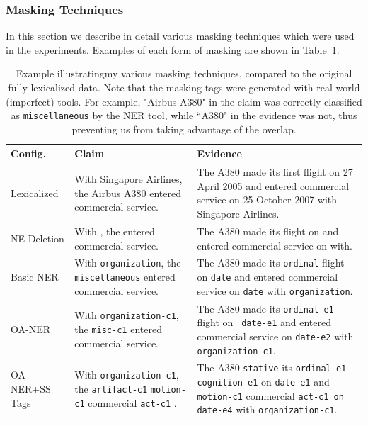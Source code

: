 \documentclass[compsoc,onecolumn]{IEEEtran}
\begin{document}
\subsubsection{Masking Techniques} \label{masking_techniques}
In this section we describe in detail various masking techniques which were used in the experiments. Examples of each form of masking are shown in Table~\ref{masking_examples}.


\begin{table}[t]
\begin{center}
\begin{tabular}{p{20mm}|p{55mm}|p{70mm}}

\textbf{Config.} & \textbf{Claim}& \textbf{Evidence} \\ \hline
Lexicalized & {With Singapore Airlines, the Airbus A380 entered commercial service.} & {The A380 made its first flight on 27 April 2005 and entered commercial service on 25 October 2007 with Singapore Airlines.}\\
\hline 
NE Deletion & {With  , the  entered commercial service.} & {The A380 made its  flight on  and entered commercial service on  with.}\\
\hline 
Basic NER  & {With \texttt{organization}, the \texttt{miscellaneous} entered commercial service.} & {The A380 made its \texttt{ordinal} flight on \texttt{date} and entered commercial service on \texttt{date} with \texttt{organization}.}\\
\hline 
OA-NER  & {With \texttt{organization-c1}, the \texttt{misc-c1} entered commercial service.} & {The A380 made its \texttt{ordinal-e1} flight on \texttt{ date-e1} and entered commercial service on \texttt{date-e2} with \texttt{organization-c1}.}\\
\hline 

\mbox{OA-NER+SS} Tags & {With \texttt{organization-c1}, the \texttt{artifact-c1} \texttt{motion-c1} commercial \texttt{act-c1} .} & {The A380 \texttt{stative} its \texttt{ordinal-e1 cognition-e1} on \texttt{date-e1} and \texttt{motion-c1} commercial \texttt{act-c1 on date-e4} with \texttt{organization-c1}.  
}\\

\end{tabular}
\end{center}

    \caption{ Example illustratingmy various masking techniques, compared to the original fully lexicalized data. Note that the masking tags were generated with real-world (imperfect) tools. For example, "Airbus A380" in the claim was correctly classified as \texttt{miscellaneous} by the NER tool, while ``A380" in the evidence was not, thus preventing us from taking advantage of the overlap. }
    \label{masking_examples}
\end{table}
\end{document}
